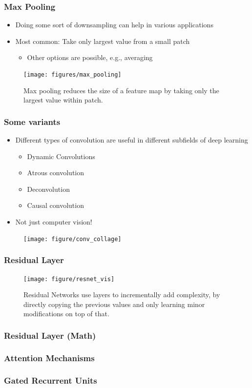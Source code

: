 \documentclass[10pt,mathserif]{beamer}
\begin{document}
\begin{frame}
  \frametitle{Max Pooling}
  \begin{itemize}
  \item Doing some sort of downsampling can help in various applications
  \item Most common: Take only largest value from a small patch
    \begin{itemize}
    \item Other options are possible, e.g., averaging
    \end{itemize}
  \end{itemize}
  \begin{figure}
    \centering
    \texttt{[image: figures/max\_pooling]}
    \caption{Max pooling reduces the size of a feature map by taking only the
      largest value within patch.
      \label{fig:max_pooling}}
  \end{figure}
\end{frame}

\begin{frame}
  \frametitle{Some variants}
  \begin{itemize}
  \item Different types of convolution are useful in different subfields of deep
    learning
    \begin{itemize}
    \item Dynamic Convolutions \citep{kalchbrenner2014convolutions}
    \item Atrous convolution \citep{chen2018deeplab}
    \item Deconvolution \citep{ronneberger2015u}
    \item Causal convolution \citep{van2016wavenet}
    \end{itemize}
  \item Not just computer vision!
  \end{itemize}
  \begin{figure}[ht]
    \centering
    \texttt{[image: figure/conv\_collage]}
    \caption{\label{fig:conv_collage} }
  \end{figure}
\end{frame}

\begin{frame}
  \frametitle{Residual Layer}
  \begin{figure}
      \centering
      \texttt{[image: figure/resnet\_vis]}
      \caption{Residual Networks use layers to incrementally
        add complexity, by directly copying the previous values and only
        learning minor modifications on top of that. \label{fig:resnet_vis} }
  \end{figure}
\end{frame}

\begin{frame}
  \frametitle{Residual Layer (Math)}
\end{frame}

\begin{frame}
  \frametitle{Attention Mechanisms}
\end{frame}

\begin{frame}
  \frametitle{Gated Recurrent Units}
\end{frame}
\end{document}
